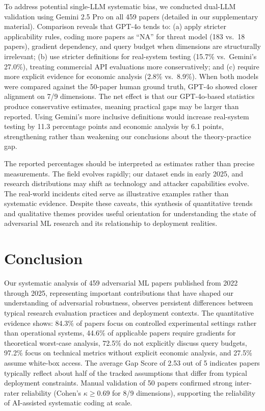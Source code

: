 \documentclass[runningheads]{llncs}
\begin{document}
To address potential single-LLM systematic bias, we conducted dual-LLM validation using Gemini 2.5 Pro on all 459 papers (detailed in our supplementary material). Comparison reveals that GPT-4o tends to: (a) apply stricter applicability rules, coding more papers as ``NA'' for threat model (183 vs.\ 18 papers), gradient dependency, and query budget when dimensions are structurally irrelevant; (b) use stricter definitions for real-system testing (15.7\% vs.\ Gemini's 27.0\%), treating commercial API evaluations more conservatively; and (c) require more explicit evidence for economic analysis (2.8\% vs.\ 8.9\%). When both models were compared against the 50-paper human ground truth, GPT-4o showed closer alignment on 7/9 dimensions. The net effect is that our GPT-4o-based statistics produce conservative estimates, meaning practical gaps may be larger than reported. Using Gemini's more inclusive definitions would increase real-system testing by 11.3 percentage points and economic analysis by 6.1 points, strengthening rather than weakening our conclusions about the theory-practice gap.

The reported percentages should be interpreted as estimates rather than precise measurements. The field evolves rapidly; our dataset ends in early 2025, and research distributions may shift as technology and attacker capabilities evolve. The real-world incidents cited serve as illustrative examples rather than systematic evidence. Despite these caveats, this synthesis of quantitative trends and qualitative themes provides useful orientation for understanding the state of adversarial ML research and its relationship to deployment realities.

\section{Conclusion}
\label{sec:conclusion}

Our systematic analysis of 459 adversarial ML papers published from 2022 through 2025, representing important contributions that have shaped our understanding of adversarial robustness, observes persistent differences between typical research evaluation practices and deployment contexts. The quantitative evidence shows: 84.3\% of papers focus on controlled experimental settings rather than operational systems, 44.6\% of applicable papers require gradients for theoretical worst-case analysis, 72.5\% do not explicitly discuss query budgets, 97.2\% focus on technical metrics without explicit economic analysis, and 27.5\% assume white-box access. The average Gap Score of 2.53 out of 5 indicates papers typically reflect about half of the tracked assumptions that differ from typical deployment constraints. Manual validation of 50 papers confirmed strong inter-rater reliability (Cohen's $\kappa \geq 0.69$ for 8/9 dimensions), supporting the reliability of AI-assisted systematic coding at scale.
\end{document}
